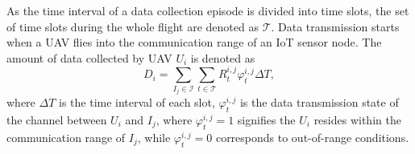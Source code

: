 \documentclass[journal]{IEEEtran}
\begin{document}
As the time interval of a data collection episode is divided into time slots, the set of time slots during the whole flight are denoted as $\mathcal{T}$. Data transmission starts when a UAV flies into the communication range of an IoT sensor node. The amount of data collected by UAV $U_i$ is denoted as 
\begin{equation}\label{collected_data}
  D_i=\sum_{I_j\in \mathcal{I}}{\sum_{t\in \mathcal{T}}{R^{i,j}_t \varphi^{i,j}_t \Delta T}},
\end{equation}
where $\Delta T$ is the time interval of each slot, $\varphi^{i,j}_t$ is the data transmission state of the channel between $U_i$ and $I_j$, where $\varphi^{i,j}_t=1$ signifies the $U_i$ resides within the communication range of $I_j$, while $\varphi^{i,j}_t=0$ corresponds to out-of-range conditions. 

\end{document}
